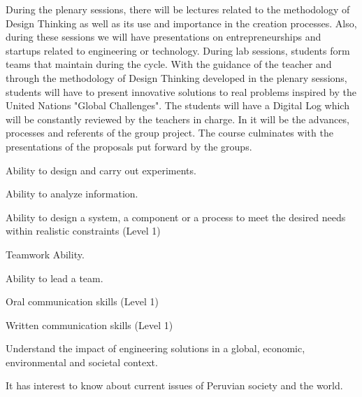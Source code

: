 \begin{syllabus}


\begin{justification}
During the plenary sessions, there will be lectures related to the methodology of Design Thinking as well as its use and importance in the creation processes. Also, during these sessions we will have presentations on entrepreneurships and startups related to engineering or technology.
During lab sessions, students form teams that maintain during the cycle. With the guidance of the teacher and through the methodology of Design Thinking developed in the plenary sessions, students will have to present innovative solutions to real problems inspired by the United Nations "Global Challenges".
The students will have a Digital Log which will be constantly reviewed by the teachers in charge. In it will be the advances, processes and referents of the group project. The course culminates with the presentations of the proposals put forward by the groups.
\end{justification}

\begin{goals}
\item Ability to design and carry out experiments.
\item Ability to analyze information.
\item Ability to design a system, a component or a process to meet the desired needs within realistic constraints (Level 1)
\item Teamwork Ability.
\item Ability to lead a team.
\item Oral communication skills (Level 1)
\item Written communication skills (Level 1)
\item Understand the impact of engineering solutions in a global, economic, environmental and societal context.
\item It has interest to know about current issues of Peruvian society and the world.
\end{goals}
    
\begin{outcomes}
    \item {}
    \item {}
\end{outcomes}

\begin{competences}
    \item {}
\end{competences}


\end{syllabus}
